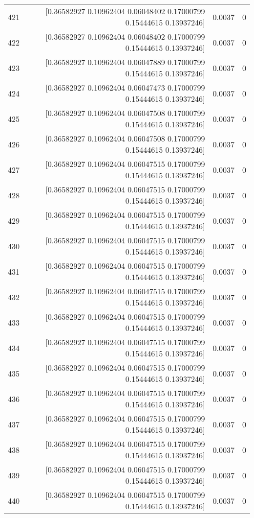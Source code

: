 \begin{longtable}{lrrr}
421 & [0.36582927 0.10962404 0.06048402 0.17000799 0.15444615 0.13937246] & 0.0037 & 0 \\
422 & [0.36582927 0.10962404 0.06048402 0.17000799 0.15444615 0.13937246] & 0.0037 & 0 \\
423 & [0.36582927 0.10962404 0.06047889 0.17000799 0.15444615 0.13937246] & 0.0037 & 0 \\
424 & [0.36582927 0.10962404 0.06047473 0.17000799 0.15444615 0.13937246] & 0.0037 & 0 \\
425 & [0.36582927 0.10962404 0.06047508 0.17000799 0.15444615 0.13937246] & 0.0037 & 0 \\
426 & [0.36582927 0.10962404 0.06047508 0.17000799 0.15444615 0.13937246] & 0.0037 & 0 \\
427 & [0.36582927 0.10962404 0.06047515 0.17000799 0.15444615 0.13937246] & 0.0037 & 0 \\
428 & [0.36582927 0.10962404 0.06047515 0.17000799 0.15444615 0.13937246] & 0.0037 & 0 \\
429 & [0.36582927 0.10962404 0.06047515 0.17000799 0.15444615 0.13937246] & 0.0037 & 0 \\
430 & [0.36582927 0.10962404 0.06047515 0.17000799 0.15444615 0.13937246] & 0.0037 & 0 \\
431 & [0.36582927 0.10962404 0.06047515 0.17000799 0.15444615 0.13937246] & 0.0037 & 0 \\
432 & [0.36582927 0.10962404 0.06047515 0.17000799 0.15444615 0.13937246] & 0.0037 & 0 \\
433 & [0.36582927 0.10962404 0.06047515 0.17000799 0.15444615 0.13937246] & 0.0037 & 0 \\
434 & [0.36582927 0.10962404 0.06047515 0.17000799 0.15444615 0.13937246] & 0.0037 & 0 \\
435 & [0.36582927 0.10962404 0.06047515 0.17000799 0.15444615 0.13937246] & 0.0037 & 0 \\
436 & [0.36582927 0.10962404 0.06047515 0.17000799 0.15444615 0.13937246] & 0.0037 & 0 \\
437 & [0.36582927 0.10962404 0.06047515 0.17000799 0.15444615 0.13937246] & 0.0037 & 0 \\
438 & [0.36582927 0.10962404 0.06047515 0.17000799 0.15444615 0.13937246] & 0.0037 & 0 \\
439 & [0.36582927 0.10962404 0.06047515 0.17000799 0.15444615 0.13937246] & 0.0037 & 0 \\
440 & [0.36582927 0.10962404 0.06047515 0.17000799 0.15444615 0.13937246] & 0.0037 & 0 \\

\end{longtable}
